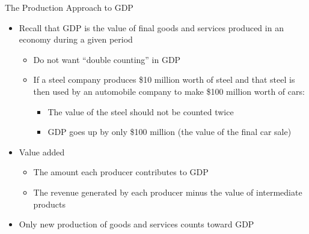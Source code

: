 \documentclass[aspectratio=1610]{beamer}
\begin{document}
\begin{frame}[wide]{The Production Approach to GDP}
	\begin{itemize}
		\item Recall that GDP is the value of final goods and services produced in an economy during a given period
		\begin{itemize}
			\item Do not want “double counting” in GDP
			\item If a steel company produces \$10 million worth of steel and that steel is then used by an automobile company to make \$100 million worth of cars:
			\begin{itemize}
				\item The value of the steel should not be counted twice
				\item GDP goes up by only \$100 million (the value of the final car sale)
			\end{itemize}
		\end{itemize}
		\item Value added
		\begin{itemize}
			\item The amount each producer contributes to GDP
			\item The revenue generated by each producer minus the value of intermediate products
		\end{itemize}
		\item Only new production of goods and services counts toward GDP
	\end{itemize}
\end{frame}
\end{document}
